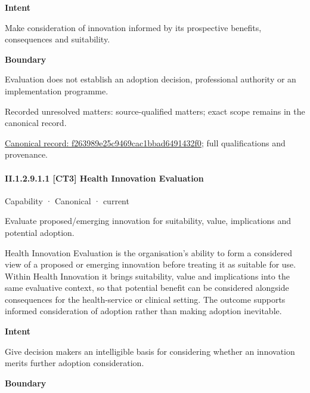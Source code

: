\textbf{Intent}



Make consideration of innovation informed by its prospective benefits, consequences and suitability.



\textbf{Boundary}



Evaluation does not establish an adoption decision, professional authority or an implementation programme.


{\small Recorded unresolved matters: source-qualified matters; exact scope remains in the canonical record.}\par
{\footnotesize \href{../../../../../../../continuum/strategy/capability/f263989e25c9469cac1bbad6491432f0.md}{Canonical record: f263989e25c9469cac1bbad6491432f0}; full qualifications and provenance.}\par
\paragraph*{II.1.2.9.1.1 [CT3] Health Innovation Evaluation}
\label{navigation:II.1.2.9.1.1}

\label{element:adc555bcb54e4de290869c7deebd128c}
{\small Capability · Canonical · current}\par

Evaluate proposed/emerging innovation for suitability, value, implications and potential adoption.



Health Innovation Evaluation is the organisation's ability to form a considered view of a proposed or emerging innovation before treating it as suitable for use. Within Health Innovation it brings suitability, value and implications into the same evaluative context, so that potential benefit can be considered alongside consequences for the health-service or clinical setting. The outcome supports informed consideration of adoption rather than making adoption inevitable.



\textbf{Intent}



Give decision makers an intelligible basis for considering whether an innovation merits further adoption consideration.



\textbf{Boundary}




